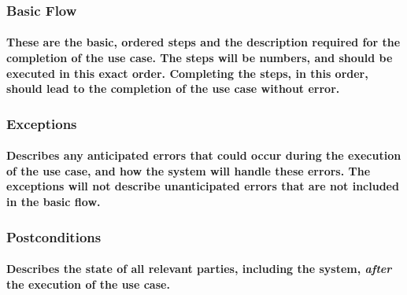 \subsubsection{Basic Flow}
\paragraph{These are the basic, ordered steps and the description required for the completion of the use case. The steps will be numbers, and should be executed in this exact order. Completing the steps, in this order, should lead to the completion of the use case without error.}

\subsubsection{Exceptions}
\paragraph{Describes any anticipated errors that could occur during the execution of the use case, and how the system will handle these errors. The exceptions will not describe unanticipated errors that are not included in the basic flow.}

\subsubsection{Postconditions}
\paragraph{Describes the state of all relevant parties, including the system, \emph{after} the execution of the use case.}
\newpage


